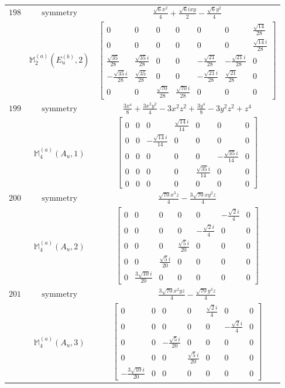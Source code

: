 \documentclass[fleqn,8pt,landscape]{jsarticle}
\begin{document}
\begin{longtable}{ccc}
$ 198 $ & $ \text{symmetry} $ & $ \frac{\sqrt{6} x^{2}}{4} + \frac{\sqrt{6} i x y}{2} - \frac{\sqrt{6} y^{2}}{4} $ \\
$  $ & $ \mathbb{M}_{2}^{(a)}(E_{u}^{(b)},2) $ & $ \begin{bmatrix} 0 & 0 & 0 & 0 & 0 & 0 & \frac{\sqrt{14}}{28} \\ 0 & 0 & 0 & 0 & 0 & 0 & \frac{\sqrt{14} i}{28} \\ \frac{\sqrt{35}}{28} & \frac{\sqrt{35} i}{28} & 0 & 0 & - \frac{\sqrt{21}}{28} & - \frac{\sqrt{21} i}{28} & 0 \\ - \frac{\sqrt{35} i}{28} & \frac{\sqrt{35}}{28} & 0 & 0 & - \frac{\sqrt{21} i}{28} & \frac{\sqrt{21}}{28} & 0 \\ 0 & 0 & \frac{\sqrt{70}}{28} & \frac{\sqrt{70} i}{28} & 0 & 0 & 0 \end{bmatrix} $ \\ \hline
$ 199 $ & $ \text{symmetry} $ & $ \frac{3 x^{4}}{8} + \frac{3 x^{2} y^{2}}{4} - 3 x^{2} z^{2} + \frac{3 y^{4}}{8} - 3 y^{2} z^{2} + z^{4} $ \\
$  $ & $ \mathbb{M}_{4}^{(a)}(A_{u},1) $ & $ \begin{bmatrix} 0 & 0 & 0 & \frac{\sqrt{14} i}{14} & 0 & 0 & 0 \\ 0 & 0 & - \frac{\sqrt{14} i}{14} & 0 & 0 & 0 & 0 \\ 0 & 0 & 0 & 0 & 0 & - \frac{\sqrt{35} i}{14} & 0 \\ 0 & 0 & 0 & 0 & \frac{\sqrt{35} i}{14} & 0 & 0 \\ 0 & 0 & 0 & 0 & 0 & 0 & 0 \end{bmatrix} $ \\ \hline
$ 200 $ & $ \text{symmetry} $ & $ \frac{\sqrt{70} x^{3} z}{4} - \frac{3 \sqrt{70} x y^{2} z}{4} $ \\
$  $ & $ \mathbb{M}_{4}^{(a)}(A_{u},2) $ & $ \begin{bmatrix} 0 & 0 & 0 & 0 & 0 & - \frac{\sqrt{2} i}{4} & 0 \\ 0 & 0 & 0 & 0 & - \frac{\sqrt{2} i}{4} & 0 & 0 \\ 0 & 0 & 0 & \frac{\sqrt{5} i}{20} & 0 & 0 & 0 \\ 0 & 0 & \frac{\sqrt{5} i}{20} & 0 & 0 & 0 & 0 \\ 0 & \frac{3 \sqrt{10} i}{20} & 0 & 0 & 0 & 0 & 0 \end{bmatrix} $ \\ \hline
$ 201 $ & $ \text{symmetry} $ & $ \frac{3 \sqrt{70} x^{2} y z}{4} - \frac{\sqrt{70} y^{3} z}{4} $ \\
$  $ & $ \mathbb{M}_{4}^{(a)}(A_{u},3) $ & $ \begin{bmatrix} 0 & 0 & 0 & 0 & \frac{\sqrt{2} i}{4} & 0 & 0 \\ 0 & 0 & 0 & 0 & 0 & - \frac{\sqrt{2} i}{4} & 0 \\ 0 & 0 & - \frac{\sqrt{5} i}{20} & 0 & 0 & 0 & 0 \\ 0 & 0 & 0 & \frac{\sqrt{5} i}{20} & 0 & 0 & 0 \\ - \frac{3 \sqrt{10} i}{20} & 0 & 0 & 0 & 0 & 0 & 0 \end{bmatrix} $ \\ \hline

\end{longtable}
\end{document}
